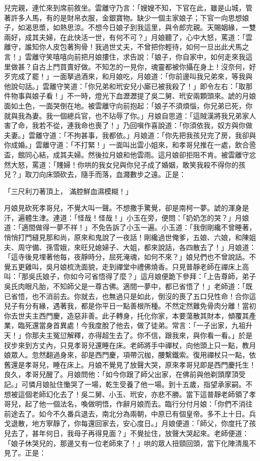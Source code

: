 \begin{showcontents}{}
兒完親，連忙來到席前敘坐。雲離守乃言：「嫂嫂不知，下官在此，雖是山城，管著許多人馬，有的是財帛衣服，金銀寶物。缺少一個主家娘子；下官一向思想娘子，如渴思漿，如熱思涼。不想今日娘子到我這里，與令郎完親。天賜姻緣，一雙兩好，成其夫婦，在此快活一世，有何不可？」月娘聽了，心中大怒，罵道：「雲離守，誰知你人皮包著狗骨！我過世丈夫，不曾把你輕待，如何一旦出此犬馬之言！」雲離守笑嘻嘻向前把月娘摟住，求告說：「娘子，你自家中，如何走來我這里做甚？自古上門買賣好做。不知怎的一見你，魂靈都被你攝在身上！沒奈何，好歹完成了罷！」一面拏過酒來，和月娘吃，月娘道：「你前邊叫我兄弟來，等我與他說句話。」雲離守笑道：「你兄弟和玳安兒小廝已被我殺了！」即令左右：「取那件物事與娘子看！」不一時，燈光下血瀝瀝提了吳二舅、玳安兩顆頭來。諕的月娘面如土色，一面哭倒在地。被雲離守向前抱起：「娘子不須煩惱，你兄弟已死，你就與我為妻。我一個總兵官，也不玷辱了你。」月娘自思道：「這賊漢將我兄弟家人害了命，我若不從，連我命也喪了！」乃回嗔作喜說道：「你須依我，奴方與你做夫妻。」雲離守道：「不拘甚事，我都依。」月娘道：「你先把我孩兒完了房，我卻與你成婚。」雲離守道：「不打緊！」一面叫出雲小姐來，和孝哥兒推在一處，飲合巹盃，館同心結，成其夫婦。然後拉月娘和他雲雨。這月娘卻拒阻不肯。被雲離守忿然大怒，罵道：「賤婦！你哄的我女兒與你兒子成了婚姻，敢笑我殺不得你的孩兒？」取刀向床頭砍去，隨手而落，血濺數步之遠。正是：

「三尺利刀著頂上，  滿腔鮮血濕模糊！」

月娘見砍死孝哥兒，不覺大叫一聲。不想撒手驚覺，卻是南柯一夢。諕的渾身是汗，遍體生津。連道：「怪哉！怪哉！」小玉在旁，便問：「奶奶怎的哭？」月娘道：「適間做得一夢不祥！」不免告訴了小玉一遍。小玉道：「我倒剛纔不曾睡著，悄悄打門縫見那和尚，原來和鬼說了一夜話！剛纔過世俺爹，五娘、六娘，和陳姐夫、周守備、孫雪娥，來旺兒媳婦子、大姐，都來說話，各四散去了！」月娘道：「這寺後見埋著他每，夜靜時分，屈死淹魂，如何不來？」娘兒們也不曾說話。不覺五更雞叫，吳月娘梳洗面貌，走到禪堂中禮佛燒香。只見普靜老師在禪床上高叫：「那吳氏娘子，你如今可省悟得了麼？」這月娘便跪下參拜：「上告尊師，弟子吳氏肉眼凡胎，不知師父是一尊古佛。適間一夢中，都已省悟了！」老師道：「既已省悟，也不消前去。你就去，也無過只是如此，倒沒的喪了五口兒性命！合你這兒子有分有緣，遇著我，都是你平日一點善根所種。不然定然難免骨肉分離！當初你去世夫主西門慶，造惡非善。此子轉身，托化你家，本要蕩散其財本，傾覆其產業，臨死還當身首異處！今我度脫了他去，做了徒弟。常言：「一子出家，九祖升天！」你那夫主冤愆解釋，亦得超生去了。你不信，跟我來，與你看一看。」於是扠步來到方丈內，只見孝哥兒還睡在床。老師將手中禪杖，向他頭上只一點，教月娘眾人。忽然翻過身來，卻是西門慶，項帶沉枷，腰繫鐵索。復用禪杖只一點，依舊還是孝哥兒，睡在床上。月娘不覺見了放聲大哭，原來孝哥兒即是西門慶托生！良久，孝哥兒醒了。月娘問他：「如今你跟了師父出家，在佛前與他剃頭摩頂受記。」可憐月娘扯住慟哭了一場，乾生受養了他一場。到十五歲，指望承家嗣。不想被這個老師幻化去了！吳二舅、小玉、玳安，亦悲不勝。當下這普靜老師領了孝哥兒，起了他一個法名，喚做明悟，作辭月娘而去。臨行分付月娘：「你們不消往前途去了。如今不久番兵退去，南北分為兩朝，中原已有個皇帝。多不上十日。兵戈退散，地方寧靜了，你每還回家去，安心度日。」月娘便道：「師父，你度托了孩兒去了，甚年何日，我母子再得見面？」不覺扯住，放聲大哭起來。老師便道：「娘子休哭兒的，那邊又有一位老師來了！」哄的眾人扭頸回頭，當下化陣清風不見了。正是：


\end{showcontents}
